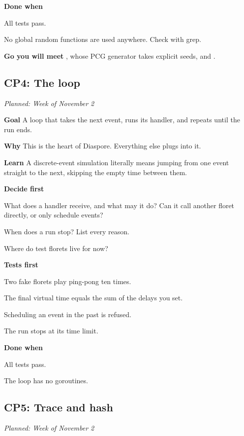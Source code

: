 \documentclass[11pt,letterpaper]{article}
\newcommand{\code}[1]{\texttt{\detokenize{#1}}}
\newcommand{\lbl}[1]{\textbf{#1}\enspace}
\newcommand{\when}[1]{\par\textit{Planned: #1}\par}
\begin{document}
\lbl{Done when}
\begin{checks}
  \item All tests pass.
  \item No global random functions are used anywhere. Check with grep.
\end{checks}

\lbl{Go you will meet} \code{math/rand/v2}, whose PCG generator takes explicit seeds, and \code{hash/fnv}.

\subsection{CP4: The loop}
\when{Week of November 2}

\lbl{Goal} A loop that takes the next event, runs its handler, and repeats until the run ends.

\lbl{Why} This is the heart of Diaspore. Everything else plugs into it.

\lbl{Learn} A discrete-event simulation literally means jumping from one event straight to the next, skipping the empty time between them.

\lbl{Decide first}
\begin{asks}
  \item What does a handler receive, and what may it do? Can it call another floret directly, or only schedule events?
  \item When does a run stop? List every reason.
  \item Where do test florets live for now?
\end{asks}

\lbl{Tests first}
\begin{checks}
  \item Two fake florets play ping-pong ten times.
  \item The final virtual time equals the sum of the delays you set.
  \item Scheduling an event in the past is refused.
  \item The run stops at its time limit.
\end{checks}

\lbl{Done when}
\begin{checks}
  \item All tests pass.
  \item The loop has no goroutines.
\end{checks}

\subsection{CP5: Trace and hash}
\when{Week of November 2}
\end{document}
